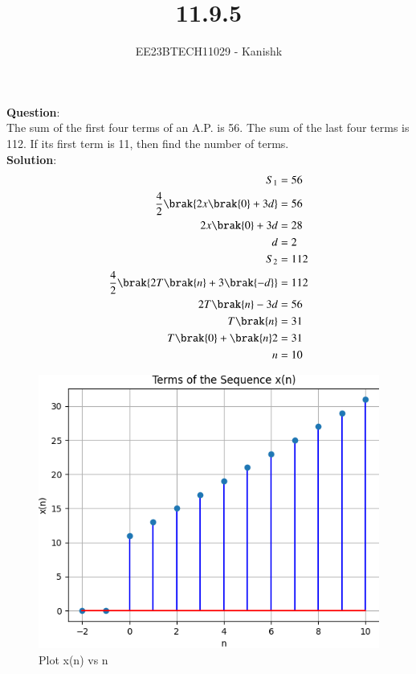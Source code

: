 \documentclass[journal,12pt,twocolumn]{IEEEtran}
\theoremstyle{remark}
\begin{document}

\vspace{3cm}

\title{11.9.5}
\author{EE23BTECH11029 - Kanishk}
\maketitle

\bigskip



\renewcommand{\thefigure}{\theenumi}
\renewcommand{\thetable}{\theenumi}
\textbf{Question}:\\ 
The sum of the first four terms of an A.P. is 56. The sum of the last four terms is
112. If its first term is 11, then find the number of terms.\\

\textbf{Solution}:\\ 
\begin{align}
S_1&=56\\
\frac{4}{2}\brak{2x\brak{0}+3d}&=56\\
2x\brak{0}+3d&=28\\
d&=2\\
S_2&=112\\
\frac{4}{2}\brak{2T\brak{n}+3\brak{-d}}&=112\\
2T\brak{n}-3d&=56\\
T\brak{n}&=31\\
T\brak{0}+\brak{n}2&=31\\
n&=10
\end{align}

\begin{figure}[h]
    \centering
    \includegraphics[width=\columnwidth]{fig.png}
    Plot x(n) vs n
    \label{fig:enter-label}
\end{figure}
\end{document}
